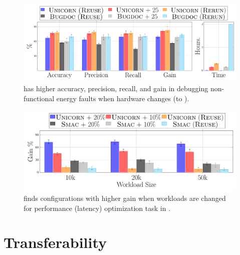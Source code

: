 \begin{figure}[tp!]
    \setlength{\belowcaptionskip}{-1.5em}
    \centering
    \includegraphics*[width=\linewidth]{figures-vg/barplot_multi_debug_orig.pdf}
    \caption{\small{{\ourapproach has higher accuracy, precision, recall, and gain in debugging non-functional energy faults when hardware changes (\xavier to \txtwo)}}.}%
    \label{fig:rq1_debugging_multi}
\end{figure}

\begin{figure}[tp!]
    \centering
    \includegraphics*[width=\linewidth]{figures-vg/barplot_multi_opt.pdf}
    \caption{\small {\ourapproach finds configurations with higher gain when workloads are changed for performance (latency) optimization task in \txtwo.}}
    
    \label{fig:rq1_opt_me}
\end{figure}

\section{Transferability} 
\label{sec:transfer}

